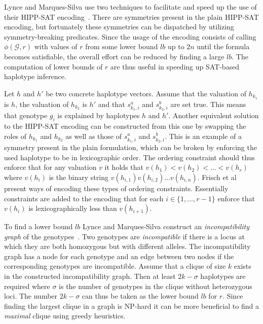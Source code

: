 \documentclass[12pt,a4paper]{article}
\begin{document}
Lynce and Marques-Silva use two techniques to facilitate and speed up the use of their HIPP-SAT encoding~\cite{DBLP:conf/aaai/LynceM06}.
There are symmetries present in the plain HIPP-SAT encoding, but fortunately these symmetries can be dispatched by utilizing symmetry-breaking predicates.
Since the usage of the encoding consists of calling $\phi (\mathcal{G}, r)$ with values of $r$ from some lower bound $lb$ up to $2n$ until the formula becomes satisfiable, the overall effort can be reduced by finding a large $lb$.
The computation of lower bounds of $r$ are thus useful in speeding up SAT-based haplotype inference.

Let $h$ and $h'$ be two concrete haplotype vectors.
Assume that the valuation of $h_{k_1}$ is $h$, the valuation of $h_{k_2}$ is $h'$ and that $s_{k_1, i}^a$ and  $s_{k_2, i}^b$ are set true.
This means that genotype $g_i$ is explained by haplotypes $h$ and $h'$.
Another equivalent solution to the HIPP-SAT encoding can be constructed from this one by swapping the roles of $h_{k_1}$ and $h_{k_2}$ as well as those of $s_{k_1, i}^a$ and  $s_{k_2, i}^b$.
This is an example of a symmetry present in the plain formulation, 
which can be broken by enforcing the used haplotype to be in lexicographic order.
The ordering constraint should thus enforce that for any valuation $v$ it holds that $v(h_1) < v(h_2) < \dots < v(h_r)$ where $v(h_i)$ is the binary string $v(h_{i,1})v(h_{i,2})\dots v(h_{i,n})$.
Frisch et al~\cite{DBLP:conf/cp/FrischHKMW02} present ways of encoding these types of ordering constraints.
Essentially constraints are added to the encoding that for each $i\in\{1,\dots ,r-1\}$ enforce that $v(h_i)$ is lexicographically less than $v(h_{i+1})$.

To find a lower bound $lb$ Lynce and Marques-Silva construct an \emph{incompatibility graph} of the genotypes~\cite{DBLP:conf/aaai/LynceM06}.
Two genotypes are \emph{incompatible} if there is a locus at which they are both homozygous but with different alleles.
The incompatibility graph has a node for each genotype and an edge between two nodes if the corresponding genotypes are incompatible.
Assume that a clique of size $k$ exists in the constructed incompatibility graph.
Then at least $2k - \sigma$ haplotypes are required where $\sigma$ is the number of genotypes in the clique without heterozygous loci.
The number $2k-\sigma$ can thus be taken as the lower bound $lb$ for $r$.
Since finding the largest clique in a graph is NP-hard it can be more beneficial to find a \emph{maximal} clique using greedy heuristics.
\end{document}
